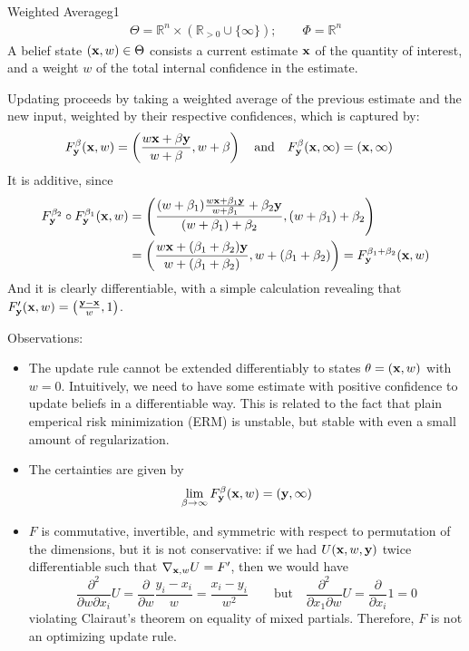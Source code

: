 \documentclass{article}
\begin{document}
\begin{examplex}{Weighted Average}{g1}
	\begin{align*}
		\Theta = \mathbb R^n \times (\mathbb R_{> 0} \cup \{\infty\});
		\qquad
		\Phi = \mathbb R^n %
	\end{align*}
	A belief state $(\mathbf{x},w) \in \Theta$ consists a current estimate $\mathbf{x}$ of the quantity of interest, and a weight $w$ of the total internal confidence in the estimate.

	Updating proceeds by taking a weighted average of the previous estimate and the new input, weighted by their respective confidences, which is captured by:
	\begin{align*}
		F^\beta_{\mathbf{y}}(\mathbf{x}, w) &=  \left( \frac{ w \mathbf{x} + \beta \mathbf{y}}{w + \beta} , w + \beta \right)
		\quad\text{and}\quad
		F^{\beta}_{\mathbf{y}}(\mathbf{x}, \infty) = (\mathbf{x}, \infty)
	\end{align*}
	It is additive, since
	\begin{align*}
		F^{\beta_2}_{\mathbf{y}} \circ F^{\beta_1}_{\mathbf{y}}(\mathbf{x}, w)
		&= \left( \frac{ (w + \beta_1) \frac{ w \mathbf{x} + \beta_1 \mathbf{y}}{w + \beta_1} + \beta_2 \mathbf{y}}{(w + \beta_1) + \beta_2}, (w  + \beta_1) + \beta_2 \right) \\
		&= \left( \frac{  w \mathbf{x} + (\beta_1 + \beta_2) \mathbf{y}}{w + (\beta_1 + \beta_2)}, w  + (\beta_1 + \beta_2)\right)
		= F^{\beta_1 + \beta_2}_{\mathbf{y}}(\mathbf{x}, w)
	\end{align*}
	And it is clearly differentiable, with a simple calculation revealing that
	$ F'_{\mathbf{y}}(\mathbf{x}, w) = \left( \frac{\mathbf{y} - \mathbf{x}}{w}, 1\right) $.

	Observations:
	\begin{itemize}
		\item The update rule cannot be extended differentiably to states $\theta = (\mathbf{x}, w)$ with $w = 0$.
			Intuitively, we need to have some estimate with positive confidence to update beliefs in a differentiable way.
			This is related to the fact that plain emperical risk minimization (ERM) is unstable, but stable with even a small amount of regularization.
		\item The certainties are given by
		\[
			\lim_{\beta \to \infty} F^{\beta}_{\mathbf{y}}(\mathbf{x}, w) = (\mathbf{y}, \infty)
		\]
		\item $F$ is commutative, invertible, and symmetric with respect to permutation of the dimensions, but it is not conservative: if we had $U(\mathbf{x}, w, \mathbf{y})$ twice differentiable such that $\nabla_{\mathbf{x}, w} U = F'$, then we would have
		\[\frac{\partial^2}{\partial w \partial x_i} U =
			\frac\partial{\partial w} \frac{y_i - x_i}{w} = \frac{x_i - y_i}{w^2}
			\qquad
			\text{but}
			\quad
			\frac{\partial^2}{\partial x_1 \partial w} U
			= \frac\partial{\partial x_i} 1 = 0
		\]
		violating Clairaut's theorem on equality of mixed partials.
		Therefore, $F$ is not an optimizing update rule.
	\end{itemize}
\end{examplex}
\end{document}
